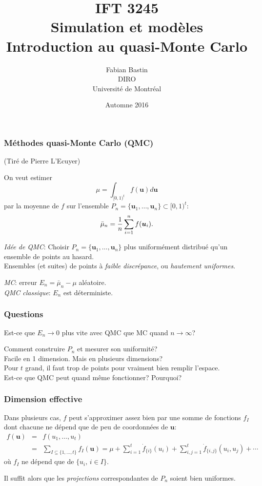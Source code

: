 \documentclass[t,usepdftitle=false]{beamer}
\title[IFT3245]{IFT 3245\\Simulation et modèles\\Introduction au quasi-Monte Carlo}
\author[Fabian Bastin]{Fabian Bastin\\DIRO\\Université de Montréal}
\date{Automne 2016}
\def\bu{\boldsymbol{u}}
\begin{document}
\frame{\titlepage}

\begin{frame}
\frametitle{M\'ethodes quasi-Monte Carlo (QMC)}

(Tiré de Pierre L'Ecuyer)

On veut estimer 
$$
{\mu} = \int_{[0,1)^t} f(\bu) d\bu
$$
par la moyenne de $f$ sur l'ensemble
${P_n} =\{\bu_1,\dots,\bu_{n}\} \subset [0,1)^{t}$:
$$
{\bar\mu_n} = {1\over n} \sum_{i=1}^{n} f(\bu_i).
$$

\emph{Id\'ee de QMC}: 
Choisir $P_n = \{\bu_1,\dots,\bu_{n}\}$ plus uniform\'ement distribu\'e
qu'un ensemble de points au hasard.\\
Ensembles (et suites) de points \`a \emph{faible discrépance}, ou
\emph{hautement uniformes}.

\mbox{}

\emph{MC}: erreur ${E_n} = \bar\mu_n - \mu$ al\'eatoire.\\
\emph{QMC classique}: $E_n$ est d\'eterministe.
 
\end{frame}

\begin{frame}
\frametitle{Questions}

Est-ce que $E_n\to 0$ plus vite avec QMC que MC quand $n\to\infty$?

\mbox{}

Comment construire $P_n$ et mesurer son uniformit\'e? \\
Facile en 1 dimension.  Mais en plusieurs dimensions?\\
Pour $t$ grand, il faut trop de points pour vraiment bien remplir l'espace.\\
Est-ce que QMC peut quand m\^eme fonctionner?  Pourquoi?

\end{frame}

\begin{frame}
\frametitle{Dimension effective}

Dans plusieurs cas, $f$ peut s'approximer assez bien par une somme de
fonctions $f_I$ dont chacune ne d\'epend que de peu de coordonn\'ees de $\bu$:
\begin {eqnarray*}
f(\bu) &=& f(u_1,\dots,u_t)\\
&=& \sum_{{I} \subseteq \{1,\dots,t\}} {f_I}(\bu) 
= \mu + \sum_{i=1}^t \dot f_{\{i\}}(u_i) 
+ \sum_{i,j=1}^t \dot f_{\{i,j\}}(u_i, u_j) + \cdots 
\end {eqnarray*}
o\`u $f_I$ ne d\'epend que de $\{u_i,\, i\in I\}$.

\mbox{}

Il suffit alors que les \emph{projections} correspondantes de $P_n$ 
soient bien uniformes.

\end{frame}
\end{document}
